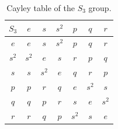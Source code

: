 \documentclass[12pt,letterpaper]{article}
\begin{document}
\begin{table}[H]
	\centering
	\caption{Cayley table of the $S_3$ group.}
	\begin{tabular}{c||c c c c c c}
        $S_3$ & $e$ & $s$ & $s^2$ & $p$ & $q$ & $r$ \\\hline\hline
        $e$   & $e$ & $s$ & $s^2$ & $p$ & $q$ & $r$ \\
        $s^2$ & $s^2$ & $e$ & $s$ & $r$ & $p$ & $q$ \\
        $s$   & $s$ & $s^2$ & $e$ & $q$ & $r$ & $p$ \\
        $p$   & $p$ & $r$ & $q$ & $e$ & $s^2$ & $s$ \\
        $q$   & $q$ & $p$ & $r$ & $s$ & $e$ & $s^2$ \\
        $r$   & $r$ & $q$ & $p$ & $s^2$ & $s$ & $e$
    \end{tabular}
\end{table}
\end{document}
